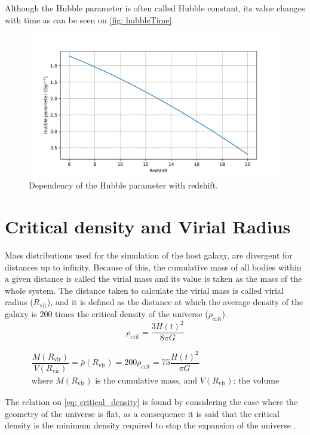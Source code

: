 	Although the Hubble parameter is often called Hubble constant, its value changes with time as can be seen on \autoref{fig: hubbleTime}. %
	\begin{figure}[h]
		\centering
		\includegraphics[width=0.8\linewidth]{"../Files/Week 5/hubble_time"}
		\caption{Dependency of the Hubble parameter with redshift.}
		\label{fig: hubbleTime}
	\end{figure}
	
	\section{Critical density and Virial Radius}\label{sec: cd_vr}
	Mass distributions used for the simulation of the host galaxy, are divergent for distances up to infinity. Because of this, the cumulative mass of all bodies within a given distance is called the virial mass and its value is taken as the mass of the whole system. The distance taken to calculate the virial mass is called virial radius ($R_\text{vir}$), and it is defined as the distance at which the average density of the galaxy is 200 times the critical density of the universe ($\rho_\text{crit}$).
	\begin{equation}\label{eq: critical_density}
	\rho_\text{crit} = \dfrac{3H(t)^2}{8\pi G}
	\end{equation}
	
	\begin{equation}\label{eq: R_vir_def}
	\begin{array}{c}
	\dfrac{M(R_\text{vir})}{V(R_\text{vir})} = \bar{\rho}(R_\text{vir}) =  200 \rho_\text{crit} = 75\dfrac{H(t)^2}{\pi G}\\
	\text{where $M(R_\text{vir})$ is the cumulative mass, and $V(R_\text{vir})$: the volume}
	\end{array}			
	\end{equation}
	
	The relation on \autoref{eq: critical_density} is found by considering the case where the geometry of the universe is flat, as a consequence it is said that the critical density is the minimum density required to stop the expansion of the universe \cite{binney2011galactic}.
